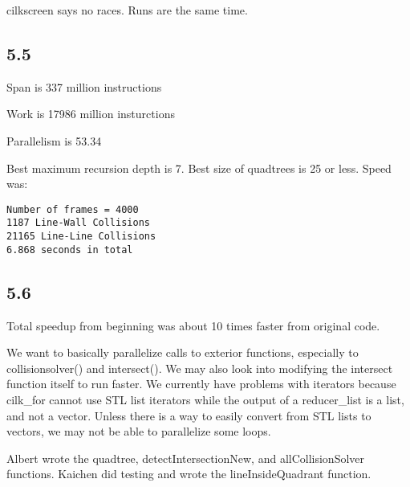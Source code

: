 \documentclass[12pt]{article}
\begin{document}
cilkscreen says no races.  Runs are the same time.  
\subsection{5.5}
Span is 337 million instructions

Work is 17986 million insturctions

Parallelism is 53.34

Best maximum recursion depth is 7.  Best size of quadtrees is 25 or less.  Speed
was:
\begin{verbatim}
Number of frames = 4000
1187 Line-Wall Collisions
21165 Line-Line Collisions
6.868 seconds in total
\end{verbatim}


\subsection{5.6}
Total speedup from beginning was about 10 times faster from original code.  


We want to basically parallelize calls to exterior functions, especially to 
collisionsolver() and intersect().  We may also look into modifying the intersect 
function itself to run faster.  We currently have problems with iterators because 
cilk_for cannot use STL list iterators while the output of a reducer_list is a 
list, and not a vector.  Unless there is a way to easily convert from STL lists 
to vectors, we may not be able to parallelize some loops.  

Albert wrote the quadtree, detectIntersectionNew, and allCollisionSolver functions.  
Kaichen did testing and wrote the lineInsideQuadrant function.  
\end{document}
